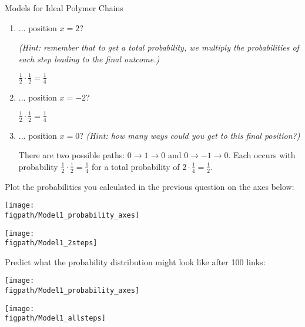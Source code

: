 \begin{activity}{Models for Ideal Polymer Chains}
\begin{ctqs}
		\begin{enumerate}
			
			\item ... position $x=2$?
			
				\emph{(Hint: remember that to get a total probability, we \emph{multiply} the probabilities of each step leading to the final outcome.)}
				
				\begin{solution}[1in]{}
				
					$\frac{1}{2}\cdot\frac{1}{2} = \frac{1}{4}$
				
				\end{solution}
				
			\item ... position $x=-2$?
				
				\begin{solution}[1in]{}
				
					$\frac{1}{2}\cdot\frac{1}{2} = \frac{1}{4}$
					
				\end{solution}
			
			\clearpage
			\item ... position $x=0$?
				\emph{(Hint: how many ways could you get to this final position?)}
				
				\begin{solution}[1in]{}
				
					There are two possible paths: $0\to 1\to 0$ and $0 \to -1 \to 0$.  Each occurs with probability $\frac{1}{2}\cdot\frac{1}{2} = \frac{1}{4}$ for a total probability of $2\cdot\frac{1}{4} = \frac{1}{2}$.
				
				\end{solution}
			
		\end{enumerate}
		
	\question Plot the probabilities you calculated in the previous question on the axes below:
	
		\begin{solution}[2.25in]{
			\centerline{\texttt{[image: \\figpath/Model1\_probability\_axes]}}
		}
			\centerline{\texttt{[image: \\figpath/Model1\_2steps]}}
		\end{solution}
	
	\question Predict what the probability distribution might look like after 100 links:
	
		\begin{solution}[2.25in]{
			\centerline{\texttt{[image: \\figpath/Model1\_probability\_axes]}}
		}
			\centerline{\texttt{[image: \\figpath/Model1\_allsteps]}}
		\end{solution}
	

\end{ctqs}
\end{activity}
